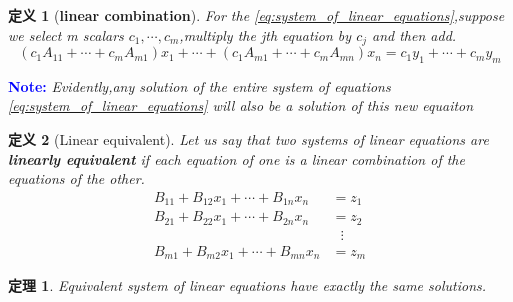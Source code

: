 \documentclass[11pt, a4paper, oneside,UTF8]{ctexbook}
\newenvironment{note}
{\par\textcolor{blue}{\bfseries Note:}\itshape}
{\par}
\newtheorem{theorem}{\indent 定理}[section]
\newtheorem{definition}{\indent 定义}[section]
\begin{document}
\begin{definition}[\textbf{linear combination}]
  For the \ref{eq:system_of_linear_equations},suppose we select m scalars $c_1,\cdots,c_m$,multiply the jth equation by $c_j$ and then add.
  \begin{displaymath}
      (c_1A_{11}+\cdots+c_mA_{m1})x_1+\cdots+(c_1A_{m1}+\cdots+c_mA_{mn})x_n = c_1y_1+\cdots+c_my_m 
  \end{displaymath}
\end{definition}

\begin{note}
    Evidently,any solution of the entire system of equations \ref{eq:system_of_linear_equations} will also be a solution of this new equaiton
\end{note}

\begin{definition}[Linear equivalent]
  Let us say that two systems of linear equations are \textbf{linearly equivalent} if each equation of one is a linear combination of the equations of the other.
  \begin{equation}  
  \begin{aligned}
    B_{11}+B_{12}x_1+\cdots+B_{1n}x_n &= z_1 \\
    B_{21}+B_{22}x_1+\cdots+B_{2n}x_n &= z_2 \\
    & \,\,\,\, \vdots \\
    B_{m1}+B_{m2}x_1+\cdots+B_{mn}x_n &= z_m
  \end{aligned} 
  \label{eq:linear_equivalent}
\end{equation}
\end{definition}

\begin{theorem}
  Equivalent system of linear equations have exactly the same solutions.
\end{theorem}
\end{document}
